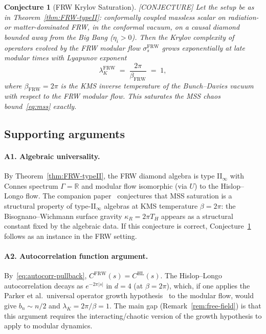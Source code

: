 \documentclass[12pt,a4paper]{article}
\newtheorem{conjecture}[theorem]{Conjecture}
\theoremstyle{definition}
\newcommand{\lK}{\lambda_K}
\newcommand{\HL}{\mathrm{HL}}
\newcommand{\FRW}{\mathrm{FRW}}
\begin{document}
\begin{conjecture}[FRW Krylov Saturation]
\label{conj:FRW-krylov}
\emph{[CONJECTURE]}
Let the setup be as in Theorem~\ref{thm:FRW-typeII}: conformally
coupled massless scalar on radiation- or matter-dominated FRW, in the
conformal vacuum, on a causal diamond bounded away from the Big Bang
($\eta_i > 0$).
Then the Krylov complexity of operators evolved by the FRW modular
flow $\sigma_s^\FRW$ grows exponentially at late modular times with
Lyapunov exponent
\begin{equation}
  \lK^\FRW \;=\; \frac{2\pi}{\beta_\FRW} \;=\; 1,
  \label{eq:conj}
\end{equation}
where $\beta_\FRW = 2\pi$ is the KMS inverse temperature of the
Bunch--Davies vacuum with respect to the FRW modular flow.
This saturates the MSS chaos bound~\eqref{eq:mss} exactly.
\end{conjecture}

\subsection{Supporting arguments}

\paragraph{A1. Algebraic universality.}
By Theorem~\ref{thm:FRW-typeII}, the FRW diamond algebra is type II$_\infty$
with Connes spectrum $\Gamma = \mathbb{R}$ and modular flow isomorphic
(via $U$) to the Hislop--Longo flow.
The companion paper~\cite{ModularShadow} conjectures that MSS saturation
is a structural property of type-II$_\infty$ algebras at KMS temperature
$\beta = 2\pi$: the Bisognano--Wichmann surface gravity $\kappa_R = 2\pi T_H$
appears as a structural constant fixed by the algebraic data.
If this conjecture is correct, Conjecture~\ref{conj:FRW-krylov} follows
as an instance in the FRW setting.

\paragraph{A2. Autocorrelation function argument.}
By~\eqref{eq:autocorr-pullback}, $C^\FRW(s) = C^\HL(s)$.
The Hislop--Longo autocorrelation decays as $e^{-2\pi|s|}$ in $d=4$
(at $\beta = 2\pi$), which, if one applies the Parker et al.\ universal
operator growth hypothesis~\cite{Parker2019} to the modular flow,
would give $b_n \sim n/2$ and $\lK = 2\pi/\beta = 1$.
The main gap (Remark~\ref{rem:free-field}) is that this argument
requires the interacting/chaotic version of the growth hypothesis
to apply to modular dynamics.
\end{document}
